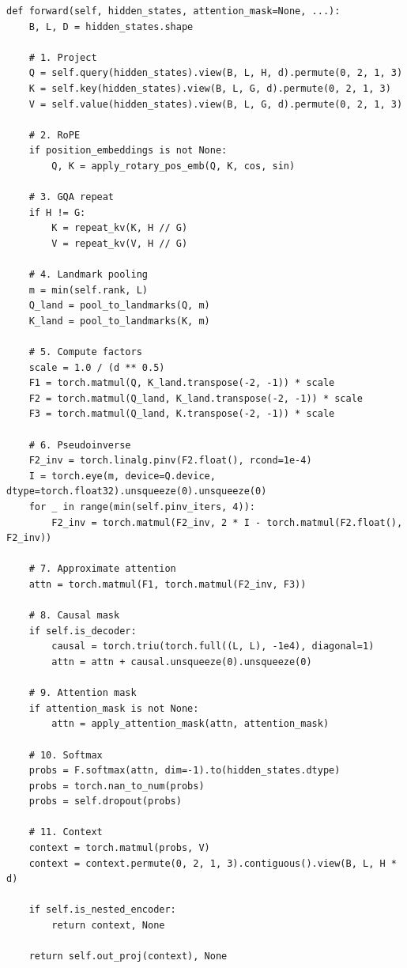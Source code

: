 \begin{lstlisting}
def forward(self, hidden_states, attention_mask=None, ...):
    B, L, D = hidden_states.shape
    
    # 1. Project
    Q = self.query(hidden_states).view(B, L, H, d).permute(0, 2, 1, 3)
    K = self.key(hidden_states).view(B, L, G, d).permute(0, 2, 1, 3)
    V = self.value(hidden_states).view(B, L, G, d).permute(0, 2, 1, 3)
    
    # 2. RoPE
    if position_embeddings is not None:
        Q, K = apply_rotary_pos_emb(Q, K, cos, sin)
    
    # 3. GQA repeat
    if H != G:
        K = repeat_kv(K, H // G)
        V = repeat_kv(V, H // G)
    
    # 4. Landmark pooling
    m = min(self.rank, L)
    Q_land = pool_to_landmarks(Q, m)
    K_land = pool_to_landmarks(K, m)
    
    # 5. Compute factors
    scale = 1.0 / (d ** 0.5)
    F1 = torch.matmul(Q, K_land.transpose(-2, -1)) * scale
    F2 = torch.matmul(Q_land, K_land.transpose(-2, -1)) * scale
    F3 = torch.matmul(Q_land, K.transpose(-2, -1)) * scale
    
    # 6. Pseudoinverse
    F2_inv = torch.linalg.pinv(F2.float(), rcond=1e-4)
    I = torch.eye(m, device=Q.device, dtype=torch.float32).unsqueeze(0).unsqueeze(0)
    for _ in range(min(self.pinv_iters, 4)):
        F2_inv = torch.matmul(F2_inv, 2 * I - torch.matmul(F2.float(), F2_inv))
    
    # 7. Approximate attention
    attn = torch.matmul(F1, torch.matmul(F2_inv, F3))
    
    # 8. Causal mask
    if self.is_decoder:
        causal = torch.triu(torch.full((L, L), -1e4), diagonal=1)
        attn = attn + causal.unsqueeze(0).unsqueeze(0)
    
    # 9. Attention mask
    if attention_mask is not None:
        attn = apply_attention_mask(attn, attention_mask)
    
    # 10. Softmax
    probs = F.softmax(attn, dim=-1).to(hidden_states.dtype)
    probs = torch.nan_to_num(probs)
    probs = self.dropout(probs)
    
    # 11. Context
    context = torch.matmul(probs, V)
    context = context.permute(0, 2, 1, 3).contiguous().view(B, L, H * d)
    
    if self.is_nested_encoder:
        return context, None
    
    return self.out_proj(context), None
\end{lstlisting}

